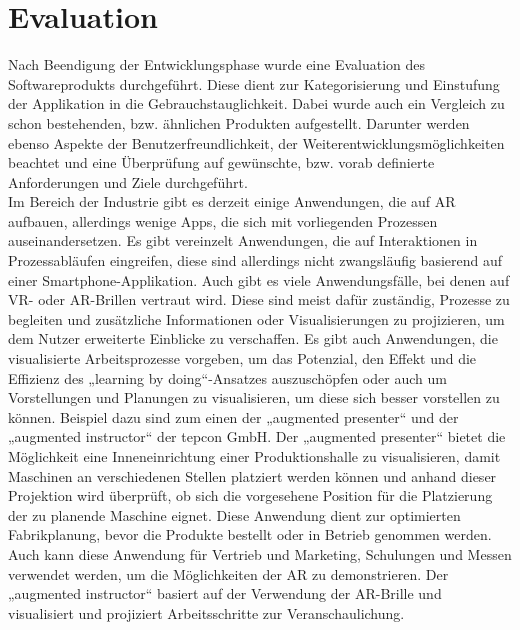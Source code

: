 \chapter{Evaluation}
\label{chap:Evaluation}
Nach Beendigung der Entwicklungsphase wurde eine Evaluation des Softwareprodukts durchgeführt. Diese dient zur Kategorisierung und Einstufung der Applikation in 
die Gebrauchstauglichkeit. Dabei wurde auch ein Vergleich zu schon bestehenden, bzw. ähnlichen Produkten aufgestellt. Darunter werden 
ebenso Aspekte der Benutzerfreundlichkeit, der Weiterentwicklungsmöglichkeiten beachtet und eine Überprüfung auf gewünschte, bzw. vorab definierte Anforderungen 
und Ziele durchgeführt. 
\\ 
\linebreak
Im Bereich der Industrie gibt es derzeit einige Anwendungen, die auf \acl{AR} aufbauen, allerdings wenige Apps, die sich mit vorliegenden Prozessen 
auseinandersetzen. Es gibt vereinzelt Anwendungen, die auf Interaktionen in Prozessabläufen eingreifen, diese sind allerdings nicht zwangsläufig basierend auf 
einer Smartphone-Applikation. Auch gibt es viele Anwendungsfälle, bei denen auf \acs{VR}- oder \acs{AR}-Brillen vertraut wird. Diese sind meist dafür zuständig, 
Prozesse zu begleiten und zusätzliche Informationen oder Visualisierungen zu projizieren, um dem Nutzer erweiterte Einblicke zu verschaffen. Es gibt auch 
Anwendungen, die visualisierte Arbeitsprozesse vorgeben, um das Potenzial, den Effekt und die Effizienz des „learning by doing“-Ansatzes auszuschöpfen oder auch 
um Vorstellungen und Planungen zu visualisieren, um diese sich besser vorstellen zu können. Beispiel dazu sind zum einen der „augmented presenter“ \cite{tepcon.2020} 
und der „augmented instructor“ \cite{tepcon.2020} der tepcon GmbH. Der „augmented presenter“ bietet die Möglichkeit eine Inneneinrichtung einer Produktionshalle 
zu visualisieren, damit Maschinen an verschiedenen Stellen platziert werden können und anhand dieser Projektion wird überprüft, ob sich die vorgesehene Position 
für die Platzierung der zu planende Maschine eignet. Diese Anwendung dient zur optimierten Fabrikplanung, bevor die Produkte bestellt oder in Betrieb genommen 
werden. Auch kann diese Anwendung für Vertrieb und Marketing, Schulungen und Messen verwendet werden, um die Möglichkeiten der \acs{AR} zu demonstrieren. Der 
„augmented instructor“ basiert auf der Verwendung der \acs{AR}-Brille und visualisiert und projiziert Arbeitsschritte zur Veranschaulichung. 
\\ 
\linebreak
